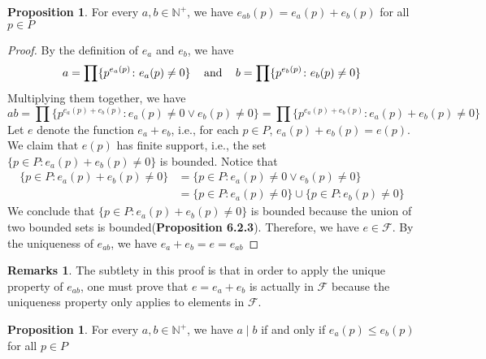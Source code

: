 \documentclass[14pt]{article}
\theoremstyle{definition}
\newtheorem*{remark}{Remarks}
\newtheorem{proposition}[definition]{Proposition}
\begin{document}
\begin{proposition}
    For every $a,b \in \mathbb{N}^+$, we have $e_{ab}(p)=e_a(p)+e_b(p)$ for all $p\in P$
\end{proposition}
\begin{proof}
    By the definition of $e_a$ and $e_b$, we have 
    \begin{equation*}
        a=\prod \{p^{e_a(p)}\colon e_a(p)\not=0\} \hspace{3mm}\text{ and } \hspace{3mm} b=\prod \{p^{e_b(p)}\colon e_b(p)\not=0\}
    \end{equation*}
    Multiplying them together, we have
    \begin{equation*}
        ab=\prod \{p^{e_a(p)+e_b(p)}\colon e_a(p)\not=0\vee e_b(p)\not=0\}=\prod \{p^{e_a(p)+e_b(p)}\colon e_a(p)+ e_b(p)\not=0\}
    \end{equation*}
    Let $e$ denote the function $e_a+e_b$, i.e., for each $p\in P$, $e_a(p)+e_b(p)=e(p)$. We claim that $e(p)$ has finite support, i.e.,  the set $\{p\in P\colon e_a(p)+e_b(p)\not=0 \}$ is bounded. Notice that
  \begin{equation*}
     \begin{split}
         \{p\in P\colon e_a(p)+e_b(p)\not=0 \}&=\{p\in P\colon e_a(p)\not=0\vee e_b(p)\not=0 \}\\&=\{p\in P\colon e_a(p)\not=0\}\cup \{p\in P\colon e_b(p)\not=0\}
     \end{split}
  \end{equation*}
  We conclude that $\{p\in P\colon e_a(p)+e_b(p)\not=0 \}$ is bounded because the union of two bounded sets is bounded(\textbf{Proposition 6.2.3}). Therefore, we have $e\in \mathcal{F}$. By the uniqueness of $e_{ab}$, we have $e_a+e_b=e=e_{ab}$
\end{proof}

\begin{remark}
    The subtlety in this proof is that in order to apply the unique property of $e_{ab}$, one must prove that $e=e_a+e_b$ is actually in $\mathcal{F}$ because the uniqueness property only applies to elements in $\mathcal{F}$.
\end{remark}

\vspace{3mm} %

\begin{proposition}
    For every $a,b\in \mathbb{N}^+$, we have $a\mid b$ if and only if $e_a(p)\leq e_b(p)$ for  all $p\in P$
\end{proposition}
\end{document}
